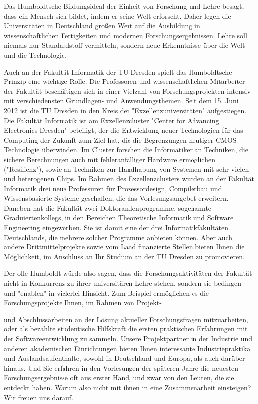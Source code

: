 Das Humboldtsche Bildungsideal der Einheit von Forschung und Lehre besagt, dass ein Mensch sich bildet, indem er seine Welt erforscht. Daher legen die Universitäten in Deutschland großen Wert auf die Ausbildung in wissenschaftlichen Fertigkeiten und modernen Forschungsergebnissen. Lehre soll niemals nur Standardstoff vermitteln, sondern neue Erkenntnisse über die Welt und die Technologie.

Auch an der Fakultät Informatik der TU Dresden spielt das Humboldtsche Prinzip eine wichtige Rolle. Die Professoren und wissenschaftlichen Mitarbeiter der Fakultät beschäftigen sich in einer Vielzahl von Forschungsprojekten intensiv mit verschiedensten Grundlagen- und Anwendungsthemen. Seit dem 15. Juni 2012 ist die TU Dresden in den Kreis der "Exzellenzuniversitäten" aufgestiegen. Die Fakultät Informatik ist am Exzellenzcluster "Center for Advancing Electronics Dresden" beteiligt, der die Entwicklung neuer Technologien für das Computing der Zukunft zum Ziel hat, die die Begrenzungen heutiger CMOS-Technologie überwinden. Im Cluster forschen die Informatiker an Techniken, die sichere Berechnungen auch mit fehleranfälliger Hardware ermöglichen ("Resilienz"), sowie an Techniken zur Handhabung von Systemen mit sehr vielen und heterogenen Chips. Im Rahmen des Exzellenzclusters wurden an der Fakultät Informatik drei neue Professuren für Prozessordesign, Compilerbau und Wissensbasierte Systeme geschaffen, die das Vorlesungsangebot erweitern. Daneben hat die Fakultät zwei Doktorandenprogramme, sogenannte Graduiertenkollegs, in den Bereichen Theoretische Informatik und Software Engineering eingeworben. Sie ist damit eine der drei Informatikfakultäten Deutschlands, die mehrere solcher Programme anbieten können. Aber auch andere Drittmittelprojekte sowie vom Land finanzierte Stellen bieten Ihnen die Möglichkeit, im Anschluss an Ihr Studium an der TU Dresden zu promovieren.

Der olle Humboldt würde also sagen, dass die Forschungsaktivitäten der Fakultät nicht in Konkurrenz zu ihrer universitären Lehre stehen, sondern sie bedingen und "enablen" in vielerlei Hinsicht. Zum Beispiel ermöglichen es die Forschungsprojekte Ihnen, im Rahmen von Projekt-

und Abschlussarbeiten an der Lösung aktueller Forschungsfragen mitzuarbeiten, oder als bezahlte studentische Hilfskraft die ersten praktischen Erfahrungen mit der Softwareentwicklung zu sammeln. Unsere Projektpartner in der Industrie und anderen akademischen Einrichtungen bieten Ihnen interessante Industriepraktika und Auslandsaufenthalte, sowohl in Deutschland und Europa, als auch darüber hinaus. Und Sie erfahren in den Vorlesungen der späteren Jahre die neuesten Forschungsergebnisse oft aus erster Hand, und zwar von den Leuten, die sie entdeckt haben. Warum also nicht mit ihnen in eine Zusammenarbeit einsteigen? Wir freuen uns darauf.

